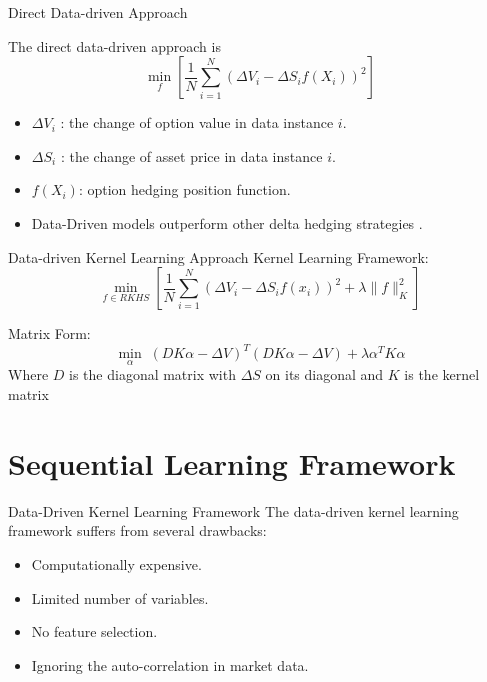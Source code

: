 \documentclass[10pt,table,mathserif]{beamer}
\begin{document}
\begin{frame}{Direct Data-driven Approach}

The direct data-driven approach is
\[
\min_{f}\left[\frac{1}{N} \sum_{i=1}^N (\Delta V_i-\Delta S_i f(X_i))^2 \right]
\]

\begin{itemize}
  \item $\Delta V_i$ : the change of option value in data instance $i$.
  \item $\Delta S_i$ : the change of asset price in data instance $i$.
  \item $f(X_i)$: option hedging position function.
  \item Data-Driven models outperform other delta hedging strategies \footnotemark.
\end{itemize}
\end{frame}

\begin{frame}{Data-driven Kernel Learning Approach}
Kernel Learning Framework:
\[
\min_{f \in RKHS}\left[\frac{1}{N} \sum_{i=1}^N(\Delta V_i-\Delta S_i f(x_i))^2+\lambda\|f\|^2_K \right]
\]

Matrix Form:
\[
\min_{\alpha} \;( D K \alpha - \Delta V)^T ( D K \alpha -\Delta V)+ \lambda \alpha^T K \alpha
\]
Where $D$ is the diagonal matrix with $\Delta S$ on its diagonal and $K$ is the kernel matrix


\end{frame}






\section{Sequential Learning Framework}


\begin{frame}{Data-Driven Kernel Learning Framework}
The data-driven kernel learning framework suffers from several drawbacks:
\begin{itemize}
\item Computationally expensive.
\item Limited number of variables.
\item No feature selection.
\item Ignoring the auto-correlation in market data.
\end{itemize}
\end{frame}
\end{document}
